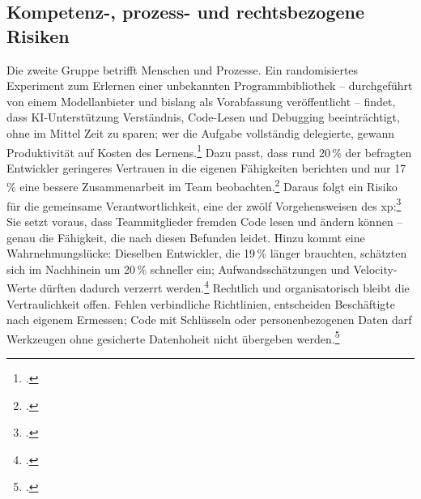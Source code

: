 \subsection{Kompetenz-, prozess- und rechtsbezogene Risiken}\label{subsec:kompetenzrisiken}
Die zweite Gruppe betrifft Menschen und Prozesse. Ein randomisiertes Experiment zum Erlernen einer unbekannten Programmbibliothek -- durchgeführt von einem Modellanbieter und bislang als Vorabfassung veröffentlicht -- findet, dass KI-Unterstützung Verständnis, Code-Lesen und Debugging beeinträchtigt, ohne im Mittel Zeit zu sparen; wer die Aufgabe vollständig delegierte, gewann Produktivität auf Kosten des Lernens.\footcite[\vglf][]{Shen.2026} Dazu passt, dass rund 20\,\% der befragten Entwickler geringeres Vertrauen in die eigenen Fähigkeiten berichten und nur 17\,\% eine bessere Zusammenarbeit im Team beobachten.\footcite[\vglf][]{Swaraj.2026} Daraus folgt ein Risiko für die gemeinsame Verantwortlichkeit, eine der zwölf Vorgehensweisen des \gls{xp}:\footcite[\vglf][ f.]{Preussig.2020} Sie setzt voraus, dass Teammitglieder fremden Code lesen und ändern können -- genau die Fähigkeit, die nach diesen Befunden leidet. Hinzu kommt eine Wahrnehmungslücke: Dieselben Entwickler, die 19\,\% länger brauchten, schätzten sich im Nachhinein um 20\,\% schneller ein; Aufwandsschätzungen und Velocity-Werte dürften dadurch verzerrt werden.\footcite[\vglf][]{Becker.2025} Rechtlich und organisatorisch bleibt die Vertraulichkeit offen. Fehlen verbindliche Richtlinien, entscheiden Beschäftigte nach eigenem Ermessen; Code mit Schlüsseln oder personenbezogenen Daten darf Werkzeugen ohne gesicherte Datenhoheit nicht übergeben werden.\footcite[\vglf][]{Neumann.2026}
